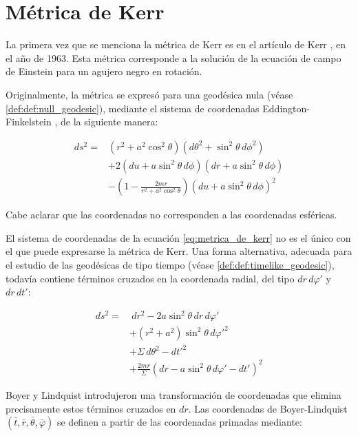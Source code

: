 \section{Métrica de Kerr}

La primera vez que se menciona la métrica de Kerr es en el artículo de Kerr \cite{kerr1963gravitational}, en el año de 1963. Esta métrica corresponde a la solución de la ecuación de campo de Einstein para un agujero negro en rotación.

Originalmente, la métrica se expresó para una geodésica nula (véase \ref{def:def:null_geodesic}), mediante el sistema de coordenadas Eddington-Finkelstein \cite{finkelstein1958past}, de la siguiente manera:

\begin{align}
ds^2 = &(r^2 + a^2 \cos^2\theta)\left(d\theta^2 + \sin^2\theta \, d\phi^2\right) \\
& + 2(du + a \sin^2\theta \, d\phi)\left(dr + a \sin^2\theta \, d\phi\right) \\
&- \left(1 - \frac{2mr}{r^2 + a^2 \cos^2\theta}\right)
\left(du + a \sin^2\theta \, d\phi\right)^2 \label{eq:metrica_de_kerr}
\end{align}

Cabe aclarar que las coordenadas no corresponden a las coordenadas esféricas.

El sistema de coordenadas de la ecuación \eqref{eq:metrica_de_kerr} no es el único con el que puede expresarse la métrica de Kerr. Una forma alternativa, adecuada para el estudio de las geodésicas de tipo tiempo (véase \ref{def:def:timelike_geodesic}), todavía contiene términos cruzados en la coordenada radial, del tipo $dr\,d\varphi'$ y $dr\,dt'$:

\begin{align}
    ds^2 = & \ dr^2 - 2a \sin^2\theta \, dr \, d\varphi' \\
    & + (r^2 + a^2)\sin^2\theta \, d\varphi'^2 \\
    & + \Sigma \, d\theta^2 - dt'^2 \\
    & + \frac{2mr}{\Sigma} \left( dr - a \sin^2\theta \, d\varphi' - dt' \right)^2
\end{align}

Boyer y Lindquist \cite{boyer1967maximal} introdujeron una transformación de coordenadas que elimina precisamente estos términos cruzados en $dr$. Las coordenadas de Boyer-Lindquist $(\bar{t}, \bar{r}, \bar{\theta}, \bar{\varphi})$ se definen a partir de las coordenadas primadas mediante:

